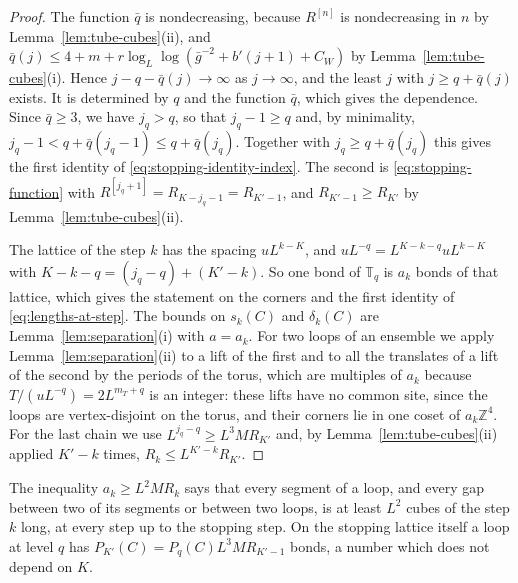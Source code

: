 \documentclass[11pt]{preprint}
\numberwithin{equation}{section}
\theoremstyle{definition}
\theoremstyle{remark}
\theoremstyle{plain}
\begin{document}
\begin{proof}
The function $\bar q$ is nondecreasing, because $R^{[n]}$ is nondecreasing in $n$ by Lemma~\ref{lem:tube-cubes}(ii), and $\bar q(j) \leq 4 + m + r\log_L\log(\bar g^{-2} + b'(j + 1) + C_W)$ by Lemma~\ref{lem:tube-cubes}(i). Hence $j - q - \bar q(j) \to \infty$ as $j \to \infty$, and the least $j$ with $j \geq q + \bar q(j)$ exists. It is determined by $q$ and the function $\bar q$, which gives the dependence. Since $\bar q \geq 3$, we have $j_q > q$, so that $j_q - 1 \geq q$ and, by minimality, $j_q - 1 < q + \bar q(j_q - 1) \leq q + \bar q(j_q)$. Together with $j_q \geq q + \bar q(j_q)$ this gives the first identity of \eqref{eq:stopping-identity-index}. The second is \eqref{eq:stopping-function} with $R^{[j_q+1]} = R_{K-j_q-1} = R_{K'-1}$, and $R_{K'-1} \geq R_{K'}$ by Lemma~\ref{lem:tube-cubes}(ii).

The lattice of the step $k$ has the spacing $uL^{k-K}$, and $uL^{-q} = L^{K-k-q}uL^{k-K}$ with $K - k - q = (j_q - q) + (K' - k)$. So one bond of $\mathbb T_q$ is $a_k$ bonds of that lattice, which gives the statement on the corners and the first identity of \eqref{eq:lengths-at-step}. The bounds on $s_k(C)$ and $\delta_k(C)$ are Lemma~\ref{lem:separation}(i) with $a = a_k$. For two loops of an ensemble we apply Lemma~\ref{lem:separation}(ii) to a lift of the first and to all the translates of a lift of the second by the periods of the torus, which are multiples of $a_k$ because $T/(uL^{-q}) = 2L^{m_T+q}$ is an integer: these lifts have no common site, since the loops are vertex-disjoint on the torus, and their corners lie in one coset of $a_k\mathbb Z^4$. For the last chain we use $L^{j_q-q} \geq L^3MR_{K'}$ and, by Lemma~\ref{lem:tube-cubes}(ii) applied $K' - k$ times, $R_k \leq L^{K'-k}R_{K'}$.
\end{proof}

The inequality $a_k \geq L^2MR_k$ says that every segment of a loop, and every gap between two of its segments or between two loops, is at least $L^2$ cubes of the step $k$ long, at every step up to the stopping step. On the stopping lattice itself a loop at level $q$ has $P_{K'}(C) = P_q(C)L^3MR_{K'-1}$ bonds, a number which does not depend on $K$.
\end{document}
